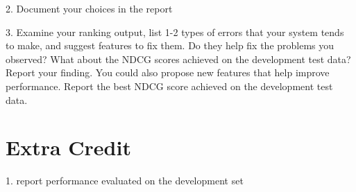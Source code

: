 2. Document your choices in the report

3.
Examine your ranking output, list 1-2 types of errors that your system tends
to make, and suggest features to fix them. Do they help fix the problems you
observed? What about the NDCG scores achieved on the development test data?
Report your finding.
You could also propose new features that help improve performance. Report the
best NDCG score achieved on the development test data.

\section{Extra Credit}
1. report performance evaluated on the development
set



